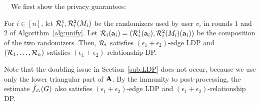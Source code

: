 \smallskip
{}~~We first show the privacy guarantees:
\begin{theorem}\label{thm:privacy_algorithms}
  For $i \in [n]$,
  let
  $\mathcal{R}_i^1, \mathcal{R}_i^2(M_i)$
  be the randomizers used by user $v_i$ in
  rounds $1$ and $2$ of Algorithm~\ref{alg:unify}. %
  Let
  $\mathcal{R}_i(\mathbf{a}_i) = (\mathcal{R}_i^1(\mathbf{a}_i), \mathcal{R}_i^2(M_i)(\mathbf{a}_i))$
  be the composition of the two randomizers. Then,
  $\mathcal{R}_i$
  satisfies
  $(\epsilon_1+\epsilon_2)$-edge LDP and
  $(\mathcal{R}_1,
  \ldots, \mathcal{R}_n)$ satisfies  $(\epsilon_1+\epsilon_2)$-relationship DP.
\end{theorem}

Note that the doubling issue in Section~\ref{sub:LDP} does not occur, 
because we use only the lower triangular part of $\mathbf{A}$. 
By the immunity to post-processing, the estimate  $\hat{f}_\triangle(G)$
also satisfies $(\epsilon_1+\epsilon_2)$-edge LDP and $(\epsilon_1+\epsilon_2)$-relationship DP.

